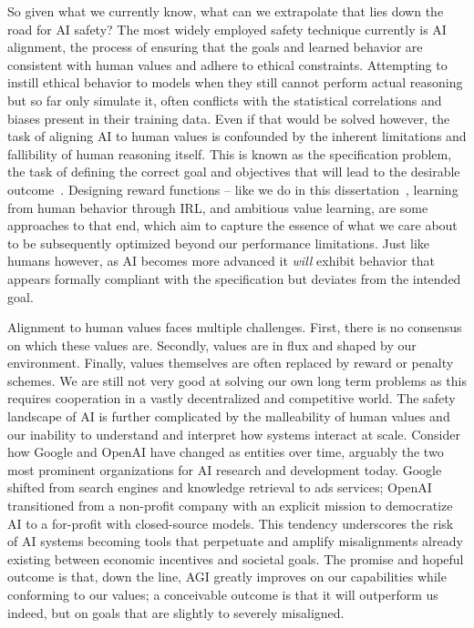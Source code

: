 So given what we currently know, what can we extrapolate that lies down the road for \gls{AI} safety?
The most widely employed safety technique currently is \gls{AI} alignment, the process of ensuring that the goals and learned behavior are consistent with human values and adhere to ethical constraints.
Attempting to instill ethical behavior to models when they still cannot perform actual reasoning but so far only simulate it, often conflicts with the statistical correlations and biases present in their training data.
Even if that would be solved however, the task of aligning \gls{AI} to human values is confounded by the inherent limitations and fallibility of human reasoning itself.
This is known as the specification problem, the task of defining the correct goal and objectives that will lead to the desirable outcome~\cite{skalse2022defining}.
Designing reward functions -- like we do in this dissertation~\cite{silver2021reward}, learning from human behavior through \gls{IRL}, and ambitious value learning, are some approaches to that end, which aim to capture the essence of what we care about to be subsequently optimized beyond our performance limitations.
Just like humans however, as AI becomes more advanced it \textit{will} exhibit behavior that appears formally compliant with the specification but deviates from the intended goal. 

Alignment to human values faces multiple challenges.
First, there is no consensus on which these values are.
Secondly, values are in flux and shaped by our environment.
Finally, values themselves are often replaced by reward or penalty schemes.
We are still not very good at solving our own long term problems as this requires cooperation in a vastly decentralized and competitive world.
The safety landscape of \gls{AI} is further complicated by the malleability of human values and our inability to understand and interpret how systems interact at scale.
Consider how Google and OpenAI have changed as entities over time, arguably the two most prominent organizations for \gls{AI} research and development today.
Google shifted from search engines and knowledge retrieval to ads services; OpenAI transitioned from a non-profit company with an explicit mission to democratize \gls{AI} to a for-profit with closed-source models.
This tendency underscores the risk of AI systems becoming tools that perpetuate and amplify misalignments already existing between economic incentives and societal goals.
The promise and hopeful outcome is that, down the line, \gls{AGI} greatly improves on our capabilities while conforming to our values; a conceivable outcome is that it will outperform us indeed, but on goals that are slightly to severely misaligned.

